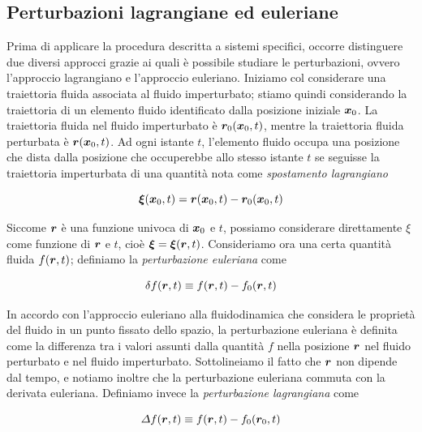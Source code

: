 \subsection{Perturbazioni lagrangiane ed euleriane}
Prima di applicare la procedura descritta a sistemi specifici, occorre distinguere due diversi approcci grazie ai quali è possibile studiare le perturbazioni, ovvero l'approccio lagrangiano e l'approccio euleriano. Iniziamo col considerare una traiettoria fluida associata al fluido imperturbato; stiamo quindi considerando la traiettoria di un elemento fluido identificato dalla posizione iniziale $\V{x}_0$. La traiettoria fluida nel fluido imperturbato è $\V{r}_0(\V{x}_0, t)$, mentre la traiettoria fluida perturbata è $\V{r}(\V{x}_0, t)$. Ad ogni istante $t$, l'elemento fluido occupa una posizione che dista dalla posizione che occuperebbe allo stesso istante $t$ se seguisse la traiettoria imperturbata  di una quantità nota come \textit{spostamento lagrangiano}
\begin{EQ}
\begin{equation}
\V{\xi}(\V{x}_0, t) = \V{r}(\V{x}_0, t) - \V{r}_0(\V{x}_0, t) \label{eq:SpostamentoLagrangiano}
\end{equation}
\end{EQ}
Siccome $\V{r}$ è una funzione univoca di $\V{x}_0$ e $t$, possiamo considerare direttamente $\xi$ come funzione di $\V{r}$ e $t$, cioè $\V{\xi} = \V{\xi} (\V{r}, t)$. Consideriamo ora una certa quantità fluida $f(\V{r}, t)$; definiamo la \textit{perturbazione euleriana} come 
\begin{EQ}
\begin{equation}
\delta f(\V{r}, t) \equiv f(\V{r}, t) - f_0(\V{r}, t) \label{eq:PerturbazioneEuleriana}
\end{equation}
\end{EQ}
In accordo con l'approccio euleriano alla fluidodinamica che considera le proprietà del fluido in un punto fissato dello spazio, la perturbazione euleriana è definita come la differenza tra i valori assunti dalla quantità $f$ nella posizione $\V{r}$ nel fluido perturbato e nel fluido imperturbato. Sottolineiamo il fatto che $\V{r}$ non dipende dal tempo, e notiamo inoltre che la perturbazione euleriana commuta con la derivata euleriana. Definiamo invece la \textit{perturbazione lagrangiana} come
\begin{EQ}
\begin{equation}
\Delta f(\V{r}, t) \equiv f(\V{r}, t) - f_0(\V{r}_0, t) \label{eq:PerturbazioneLagrangiana}
\end{equation}
\end{EQ}
